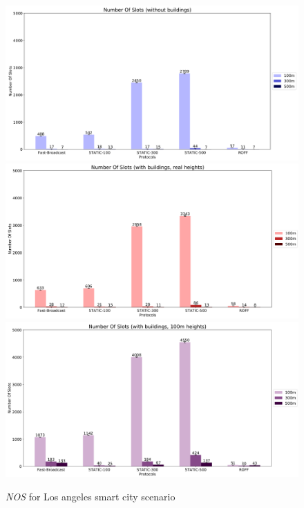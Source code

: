 	\begin{figure}[H]
		\centering
		\includegraphics[width=1.0\textwidth]{immagini/la-smart-city/b0/nos}
		\includegraphics[width=1.0\textwidth]{immagini/la-smart-city/b1/h0/nos}
		\includegraphics[width=1.0\textwidth]{immagini/la-smart-city/b1//h1/nos}
		\caption{\textit{NOS} for Los angeles smart city scenario}
		\label{fig:la-smart-city-nos}
	\end{figure}

